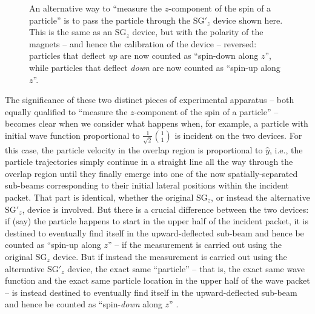\documentclass[aps,prc,onecolumn,letterpaper,floatfix,12pt]{revtex4}
\begin{document}
\begin{figure}[t]
\begin{center}
\scalebox{0.85}{

}
\caption{
An alternative way to ``measure the $z$-component of the spin of a
particle'' is to pass the particle through the $\text{SG}'_z$ device
shown here.
This is the same as an $\text{SG}_z$ device, but with the polarity of
the magnets -- and hence the calibration of the device -- reversed:
particles that deflect \emph{up} are now counted as ``spin-down along
$z$'', while particles that deflect \emph{down} are now counted as
``spin-up along $z$''.  
\label{fig5}
}
\end{center}
\end{figure}



The significance of these two distinct pieces of experimental
apparatus -- both equally qualified to ``measure the $z$-component of
the spin of a particle'' -- becomes clear when we consider what
happens when, for example, a particle with initial wave function
proportional to
$\frac{1}{\sqrt{2}} \binom{1}{1}$ is incident on the two devices.  For
this case, the particle velocity in the overlap region is proportional
to $\hat{y}$, i.e., the particle trajectories simply continue in a
straight line all the way through the overlap region until they
finally emerge into one of the now spatially-separated sub-beams
corresponding to their initial lateral positions within the incident
packet.  That part is identical, whether the original $\text{SG}_z$,
or instead the alternative $\text{SG}'_z$, device is involved.  
But there is a crucial difference between the two devices:  if (say)
the particle happens to start in the upper half of the incident
packet, it is destined to eventually find itself in the
upward-deflected sub-beam and hence be counted as ``spin-up along
$z$'' -- if the measurement is carried out using the original
$\text{SG}_z$ device.  But if instead the measurement is
carried out using the alternative $\text{SG}'_z$ device, the exact
same ``particle'' -- that is, the exact same wave function and the exact
same particle location in the upper half of the wave packet -- is
instead destined to eventually find itself in the upward-deflected
sub-beam and hence be counted as ``spin-\emph{down} along $z$'' \cite{context}.  



\end{document}
